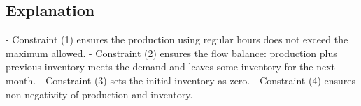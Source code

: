 \documentclass{article}
\begin{document}
\subsection*{Explanation}
- Constraint (1) ensures the production using regular hours does not exceed the maximum allowed.
- Constraint (2) ensures the flow balance: production plus previous inventory meets the demand and leaves some inventory for the next month.
- Constraint (3) sets the initial inventory as zero.
- Constraint (4) ensures non-negativity of production and inventory.
\end{document}
